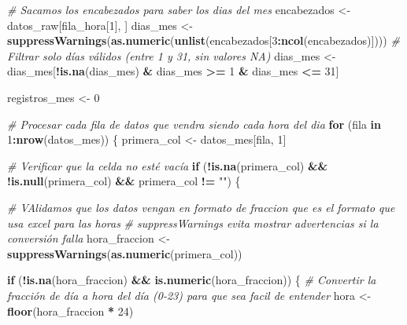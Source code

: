 \documentclass[
]{article}
\newenvironment{Shaded}{\begin{snugshade}}{\end{snugshade}}
\newcommand{\CommentTok}[1]{\textcolor[rgb]{0.56,0.35,0.01}{\textit{#1}}}
\newcommand{\ControlFlowTok}[1]{\textcolor[rgb]{0.13,0.29,0.53}{\textbf{#1}}}
\newcommand{\DecValTok}[1]{\textcolor[rgb]{0.00,0.00,0.81}{#1}}
\newcommand{\FunctionTok}[1]{\textcolor[rgb]{0.13,0.29,0.53}{\textbf{#1}}}
\newcommand{\NormalTok}[1]{#1}
\newcommand{\OtherTok}[1]{\textcolor[rgb]{0.56,0.35,0.01}{#1}}
\newcommand{\SpecialCharTok}[1]{\textcolor[rgb]{0.81,0.36,0.00}{\textbf{#1}}}
\newcommand{\StringTok}[1]{\textcolor[rgb]{0.31,0.60,0.02}{#1}}
\begin{document}
\begin{Shaded}
\begin{Highlighting}[]
        \CommentTok{\# Sacamos los encabezados para saber los dias del mes}
\NormalTok{        encabezados }\OtherTok{\textless{}{-}}\NormalTok{ datos\_raw[fila\_hora[}\DecValTok{1}\NormalTok{], ]}
\NormalTok{        dias\_mes }\OtherTok{\textless{}{-}} \FunctionTok{suppressWarnings}\NormalTok{(}\FunctionTok{as.numeric}\NormalTok{(}\FunctionTok{unlist}\NormalTok{(encabezados[}\DecValTok{3}\SpecialCharTok{:}\FunctionTok{ncol}\NormalTok{(encabezados)])))}
        \CommentTok{\# Filtrar solo días válidos (entre 1 y 31, sin valores NA)}
\NormalTok{        dias\_mes }\OtherTok{\textless{}{-}}\NormalTok{ dias\_mes[}\SpecialCharTok{!}\FunctionTok{is.na}\NormalTok{(dias\_mes) }\SpecialCharTok{\&}\NormalTok{ dias\_mes }\SpecialCharTok{\textgreater{}=} \DecValTok{1} \SpecialCharTok{\&}\NormalTok{ dias\_mes }\SpecialCharTok{\textless{}=} \DecValTok{31}\NormalTok{]}
        
\NormalTok{        registros\_mes }\OtherTok{\textless{}{-}} \DecValTok{0}
        
        \CommentTok{\# Procesar cada fila de datos que vendra siendo cada hora del dia}
        \ControlFlowTok{for}\NormalTok{ (fila }\ControlFlowTok{in} \DecValTok{1}\SpecialCharTok{:}\FunctionTok{nrow}\NormalTok{(datos\_mes)) \{}
\NormalTok{          primera\_col }\OtherTok{\textless{}{-}}\NormalTok{ datos\_mes[fila, }\DecValTok{1}\NormalTok{]}
          
          \CommentTok{\# Verificar que la celda no esté vacía}
          \ControlFlowTok{if}\NormalTok{ (}\SpecialCharTok{!}\FunctionTok{is.na}\NormalTok{(primera\_col) }\SpecialCharTok{\&\&} \SpecialCharTok{!}\FunctionTok{is.null}\NormalTok{(primera\_col) }\SpecialCharTok{\&\&}\NormalTok{ primera\_col }\SpecialCharTok{!=} \StringTok{""}\NormalTok{) \{}
            
            \CommentTok{\# VAlidamos que los datos vengan en formato de fraccion que es el formato que usa excel para las horas}
            \CommentTok{\# suppressWarnings evita mostrar advertencias si la conversión falla}
\NormalTok{            hora\_fraccion }\OtherTok{\textless{}{-}} \FunctionTok{suppressWarnings}\NormalTok{(}\FunctionTok{as.numeric}\NormalTok{(primera\_col))}
            
            \ControlFlowTok{if}\NormalTok{ (}\SpecialCharTok{!}\FunctionTok{is.na}\NormalTok{(hora\_fraccion) }\SpecialCharTok{\&\&} \FunctionTok{is.numeric}\NormalTok{(hora\_fraccion)) \{}
              \CommentTok{\# Convertir la fracción de día a hora del día (0{-}23) para que sea facil de entender}
\NormalTok{              hora }\OtherTok{\textless{}{-}} \FunctionTok{floor}\NormalTok{(hora\_fraccion }\SpecialCharTok{*} \DecValTok{24}\NormalTok{)}
              

\end{Highlighting}
\end{Shaded}
\end{document}
